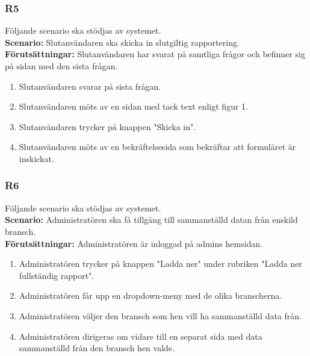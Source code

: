 \documentclass{article}
\begin{document}
        \subsubsection*{R5}
    Följande scenario ska stödjas av systemet.
        \\
       \indent \textbf{Scenario:} Slutanvändaren ska skicka in slutgiltig rapportering.
        \\
       \indent \textbf{Förutsättningar:} Slutanvändaren har svarat på samtliga frågor och befinner sig på sidan med den sista frågan.
            \begin{enumerate}
                \item Slutanvändaren svarar på sista frågan.
                \item Slutanvändaren möts av en sidan med tack text enligt figur 1.
                \item Slutanvändaren trycker på knappen "Skicka in".
                \item  Slutanvändaren möts av en bekräftelsesida som bekräftar att formuläret är inskickat.
            \end{enumerate}
            
       \subsubsection*{R6}
    Följande scenario ska stödjas av systemet.
        \\
       \indent \textbf{Scenario:} Administratören ska få tillgång till sammanställd datan från enskild bransch.
        \\
       \indent \textbf{Förutsättningar:} Administratören är inloggad på admins hemsidan.
            \begin{enumerate}
                \item Administratören trycker på knappen "Ladda ner" under rubriken "Ladda ner fullständig rapport".
                \item Administratören får upp en dropdown-meny med de olika branscherna.
                \item Administratören väljer den bransch som hen vill ha sammanställd data från.
                \item  Administratören dirigeras om vidare till en separat sida med data sammanställd från den bransch hen valde.
            \end{enumerate}
            
\end{document}
